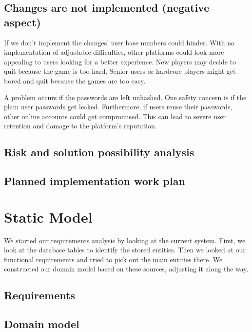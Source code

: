 \documentclass[11pt,a4paper]{article}
\begin{document}
\subsection{Changes are not implemented (negative aspect)}

If we don't implement the changes' user base numbers could hinder. With no implementation of adjustable difficulties, other platforms could look more appealing to users looking for a better experience. New players may decide to quit because the game is too hard. Senior users or hardcore players might get bored and quit because the games are too easy.

A problem occurs if the passwords are left unhashed. One safety concern is if the plain user passwords get leaked. Furthermore, if users reuse their passwords, other online accounts could get compromised. This can lead to severe user retention and damage to the platform's reputation.



\subsection{Risk and solution possibility analysis}



\subsection{Planned implementation work plan}



\section{Static Model}
We started our requirements analysis by looking at the current system. First, we look at the database tables to identify the stored entities. Then we looked at our functional requirements and tried to pick out the main entities there. We constructed our domain model based on these sources, adjusting it along the way.

\subsection{Requirements} %




\subsection{Domain model}
\end{document}
